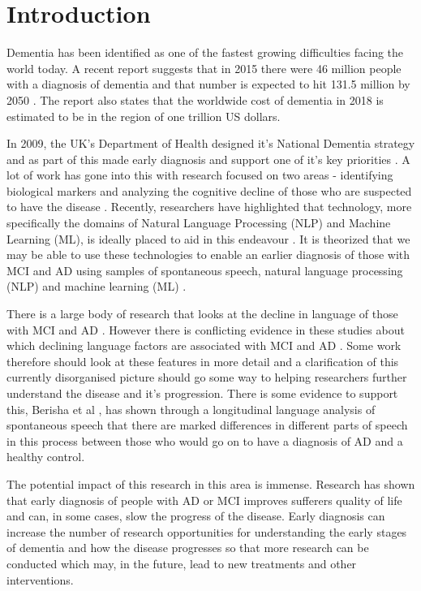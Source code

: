 \documentclass[10pt]{article}
\begin{document}
\section{Introduction}
Dementia has been identified as one of the fastest growing difficulties facing the world today. A recent report suggests that in 2015 there were 46 million people with a diagnosis of dementia and that number is expected to hit 131.5 million by 2050 \cite{Prince2015}. The report also states that the worldwide cost of dementia in 2018 is estimated to be in the region of one trillion US dollars.
\par
In 2009, the UK's Department of Health designed it's National Dementia strategy and as part of this made early diagnosis and support one of it's key priorities \cite{England2009}. A lot of work has gone into this with research focused on two areas - identifying biological markers and analyzing the cognitive decline of those who are suspected to have the disease \cite{Taler2008}. Recently, researchers have highlighted that technology, more specifically the domains of Natural Language Processing (NLP) and Machine Learning (ML), is ideally placed to aid in this endeavour \cite{Boschi2017}. It is theorized that we may be able to use these technologies to enable an earlier diagnosis of those with MCI and AD using samples of spontaneous speech, natural language processing (NLP) and machine learning (ML) \cite{Orimaye2014, Boschi2017}.
\par
There is a large body of research that looks at the decline in language of those with MCI and AD \cite{Taler2008, Boschi2017, Emery2000}. However there is conflicting evidence in these studies about which declining language factors are associated with MCI and AD \cite{Taler2008, Boschi2017}. Some work therefore should look at these features in more detail and a clarification of this currently disorganised picture should go some way to helping researchers further understand the disease and it's progression. There is some evidence to support this, Berisha et al \cite{Berisha2015}, has shown through a longitudinal language analysis of spontaneous speech that there are marked differences in different parts of speech in this process between those who would go on to have a diagnosis of AD and a healthy control. 
\par
The potential impact of this research in this area is immense. Research has shown that early diagnosis of people with AD or MCI improves sufferers quality of life and can, in some cases, slow the progress of the disease. Early diagnosis can increase the number of research opportunities for understanding the early stages of dementia and how the disease progresses so that more research can be conducted which may, in the future, lead to new treatments and other interventions.
\end{document}

